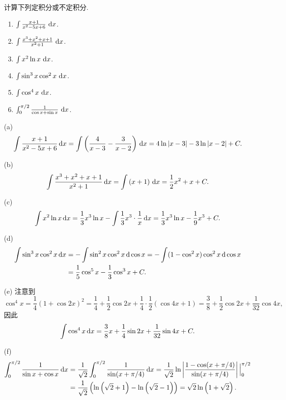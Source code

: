 \documentclass{article}
\begin{document}
\begin{problem}
计算下列定积分或不定积分.
\begin{enumerate}[label=(\alph*)]
  \item $\int \frac{x+1}{x^2 - 5x + 6}\,\,\mathrm{d} x$.
  \item $\int \frac{x^3 + x^2 + x + 1}{x^2 + 1}\,\,\mathrm{d} x$.
  \item $\int x^2 \ln x\,\,\mathrm{d} x$.
  \item $\int \sin^3 x \cos^2 x\,\,\mathrm{d} x$.
  \item $\int \cos^4 x\,\,\mathrm{d} x$.
  \item $\int_0^{\pi/2} \frac{1}{\cos x + \sin x}\,\,\mathrm{d} x$.
\end{enumerate}
\end{problem}

\begin{solution}
  (a) \[ \int \frac{x+1}{x^2-5x+6}\,\mathrm{d} x=\int\left( \frac{4}{x-3}-\frac{3}{x-2} \right)\,\mathrm{d} x = 4\ln|x-3| - 3\ln|x-2| + C. \]

  (b) \[ \int \frac{x^3+x^2+x+1}{x^2+1}\,\mathrm{d} x=\int \left( x+1 \right) \,\mathrm{d} x = \frac{1}{2}x^2 + x + C. \]

  (c) \[ \int x^2\ln x\,\mathrm{d} x= \frac{1}{3}x^3\ln x-\int \frac{1}{3}x^3\cdot\frac{1}{x}\,\mathrm{d} x = \frac{1}{3}x^3\ln x - \frac{1}{9}x^3 + C. \]

  (d) \begin{align*}
    \int \sin^3 x\cos^2 x\,\mathrm{d} x
    &=-\int \sin^2x\cos^2 x\,\mathrm{d}\cos x
    =-\int (1-\cos^2 x)\cos^2 x\,\mathrm{d}\cos x\\
    &=\frac{1}{5}\cos^5 x-\frac{1}{3}\cos^3 x+C.
  \end{align*}

  (e) 注意到
  \[ \cos^4x=\frac{1}{4}(1+\cos 2x)^2=\frac{1}{4}+\frac{1}{2}\cos 2x + \frac{1}{4}\cdot \frac{1}{2}(\cos 4x+1)=\frac{3}{8}+\frac{1}{2}\cos 2x + \frac{1}{32}\cos 4x, \]
  因此
  \[ \int\cos^4 x\,\mathrm{d} x=\frac{3}{8}x+\frac{1}{4}\sin 2x+ \frac{1}{32}\sin 4x +C. \]

  (f) \begin{align*}
    \int_{0}^{\pi/2}\frac{1}{\sin x+\cos x}\,\mathrm{d} x
    &=\frac{1}{\sqrt{2}}\int_{0}^{\pi/2}\frac{1}{\sin(x+\pi/4)}\,\mathrm{d} x
    =\frac{1}{\sqrt{2}}\ln\left|\frac{1-\cos(x+\pi/4)}{\sin(x+\pi/4)}\right|\Big|_0^{\pi/2}\\
    &=\frac{1}{\sqrt{2}}\left( \ln\left( \sqrt{2}+1 \right)-\ln\left( \sqrt{2}-1 \right) \right)
    =\sqrt{2}\ln\left( 1+\sqrt{2} \right).
  \end{align*}
\end{solution}
\end{document}
